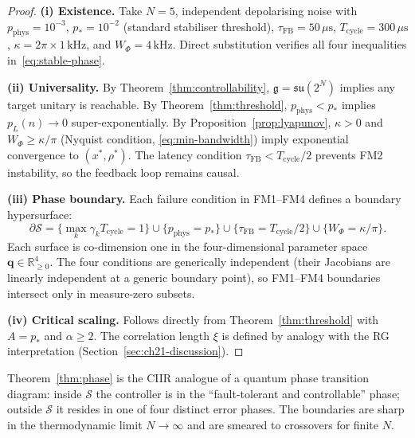 \begin{proof}
\textbf{(i) Existence.}  Take $N = 5$, independent depolarising noise
with $p_{\mathrm{phys}} = 10^{-3}$, $p_* = 10^{-2}$ (standard stabiliser
threshold), $\tau_{\mathrm{FB}} = 50\,\mu\text{s}$,
$T_{\mathrm{cycle}} = 300\,\mu\text{s}$, $\kappa = 2\pi \times 1\,\text{kHz}$,
and $W_\Phi = 4\,\text{kHz}$.  Direct substitution verifies all four
inequalities in~\eqref{eq:stable-phase}.

\medskip\noindent
\textbf{(ii) Universality.}  By Theorem~\ref{thm:controllability},
$\mathfrak{g} = \mathfrak{su}(2^N)$ implies any target unitary is
reachable.  By Theorem~\ref{thm:threshold}, $p_{\mathrm{phys}} < p_*$
implies $p_L(n) \to 0$ super-exponentially.  By
Proposition~\ref{prop:lyapunov}, $\kappa > 0$ and $W_\Phi \geq \kappa/\pi$
(Nyquist condition, \eqref{eq:min-bandwidth}) imply exponential convergence
to $(x^*, \rho^*)$.  The latency condition $\tau_{\mathrm{FB}} < T_{\mathrm{cycle}}/2$
prevents FM2 instability, so the feedback loop remains causal.

\medskip\noindent
\textbf{(iii) Phase boundary.}  Each failure condition in FM1--FM4 defines
a boundary hypersurface:
\[
  \partial\mathcal{S}
  = \bigl\{\max_k \gamma_k T_{\mathrm{cycle}} = 1\bigr\}
  \cup \bigl\{p_{\mathrm{phys}} = p_*\bigr\}
  \cup \bigl\{\tau_{\mathrm{FB}} = T_{\mathrm{cycle}}/2\bigr\}
  \cup \bigl\{W_\Phi = \kappa/\pi\bigr\}.
\]
Each surface is co-dimension one in the four-dimensional parameter space
$\mathbf{q} \in \mathbb{R}_{\geq 0}^4$.  The four conditions are
generically independent (their Jacobians are linearly independent at a
generic boundary point), so FM1--FM4 boundaries intersect only in
measure-zero subsets.

\medskip\noindent
\textbf{(iv) Critical scaling.}  Follows directly from
Theorem~\ref{thm:threshold} with $A = p_*$ and $\alpha \geq 2$.  The
correlation length $\xi$ is defined by analogy with the RG interpretation
(Section~\ref{sec:ch21-discussion}).
\end{proof}

\begin{remark}
Theorem~\ref{thm:phase} is the CIIR analogue of a quantum phase transition
diagram: inside $\mathcal{S}$ the controller is in the ``fault-tolerant
and controllable'' phase; outside $\mathcal{S}$ it resides in one of four
distinct error phases.  The boundaries are sharp in the thermodynamic
limit $N \to \infty$ and are smeared to crossovers for finite $N$.
\end{remark}

